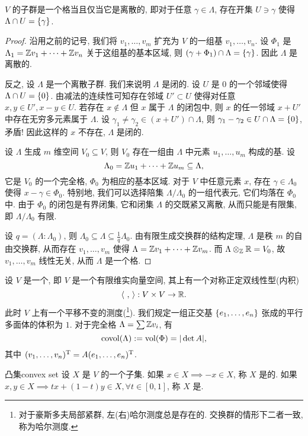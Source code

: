 \begin{proposition}{}{}
$V$ 的子群是一个格当且仅当它是离散的, 即对于任意 $\gamma\in \Lambda$, 存在开集 $U\ni \gamma$ 使得 $\Lambda\cap U=\left\{\gamma\right\}$.
\end{proposition}
\begin{proof}
沿用之前的记号, 我们将 $v_1,\dots,v_m$ 扩充为 $V$ 的一组基 $v_1,\dots,v_n$. 设 $\Phi_1$ 是 $\Lambda_1={\mathbb{Z}} v_1+\cdots+{\mathbb{Z}} v_n$ 关于这组基的基本区域, 则 $(\gamma+\Phi_1)\cap \Lambda=\left\{\gamma\right\}$. 因此 $\Lambda$ 是离散的.

反之, 设 $\Lambda$ 是一个离散子群. 我们来说明 $\Lambda$ 是闭的. 设 $U$ 是 $0$ 的一个邻域使得 $\Lambda\cap U=\left\{0\right\}$. 由减法的连续性可知存在邻域 $U'\subset U$ 使得对任意 $x,y\in U', x-y\in U$. 若存在 $x\notin \Lambda$ 但 $x$ 属于 $\Lambda$ 的闭包中, 则 $x$ 的任一邻域 $x+U'$ 中存在无穷多元素属于 $\Lambda$. 设 $\gamma_1\neq\gamma_2\in (x+U')\cap\Lambda$, 则 $\gamma_1-\gamma_2\in U\cap\Lambda=\left\{0\right\}$, 矛盾! 因此这样的 $x$ 不存在, $\Lambda$ 是闭的.

设 $\Lambda$ 生成 $m$ 维空间 $V_0\subseteq V$, 则 $V_0$ 存在一组由 $\Lambda$ 中元素 $u_1,\dots,u_m$ 构成的基. 设
	\[\Lambda_0={\mathbb{Z}} u_1+\cdots+{\mathbb{Z}} u_m\subseteq \Lambda,\]
它是 $V_0$ 的一个完全格, $\Phi_0$ 为相应的基本区域. 对于 $V$ 中任意元素 $x$, 存在 $\gamma\in\Lambda_0$ 使得 $x-\gamma\in\Phi_0$. 特别地, 我们可以选择陪集 $\Lambda/\Lambda_0$ 的一组代表元, 它们均落在 $\Phi_0$ 中. 由于 $\Phi_0$ 的闭包是有界闭集, 它和闭集 $\Lambda$ 的交既紧又离散, 从而只能是有限集, 即 $\Lambda/\Lambda_0$ 有限. 

设 $q=(\Lambda:\Lambda_0)$, 则 $\Lambda_0\subseteq \Lambda\subseteq \frac{1}{q}\Lambda_0$. 由有限生成交换群的结构定理, $\Lambda$ 是秩 $m$ 的自由交换群, 从而存在 $v_1,\dots,v_m$ 使得 $\Lambda={\mathbb{Z}} v_1+\cdots+{\mathbb{Z}} v_m$. 而 $\Lambda\otimes_{\mathbb{Z}}{\mathbb{R}}=V_0$, 故 $v_1,\dots,v_m$ 线性无关, 从而 $\Lambda$ 是一个格.
\end{proof}

设 $V$ 是一个, 即 $V$ 是一个有限维实向量空间, 其上有一个对称正定双线性型(内积)
  \[\langle{\ ,\ }\rangle: V\times V\to {\mathbb{R}}.\]
此时 $V$ 上有一个平移不变的测度(\footnote{对于豪斯多夫局部紧群, 左(右)哈尔测度总是存在的. 交换群的情形下二者一致, 称为哈尔测度.}). 我们规定一组正交基 $\left\{e_1,\dots,e_n\right\}$ 张成的平行多面体的体积为 $1$.
对于完全格 $\Lambda=\sum {\mathbb{Z}} v_i$, 有
  \[{\mathrm{covol}}(\Lambda):={\mathrm{vol}}(\Phi)=|\det A|,\]
其中 $(v_1,\dots,v_n)^{\mathrm{T}}=A(e_1,\dots,e_n)^{\mathrm{T}}$.

\begin{definition}{凸集}{convex set}
设 $X$ 是 $V$ 的一个子集. 如果 $x\in X\implies -x\in X$, 称 $X$ 是的. 如果 $x,y\in X\implies tx+(1-t)y\in X,\forall t\in [0,1]$, 称 $X$ 是.
\end{definition}

